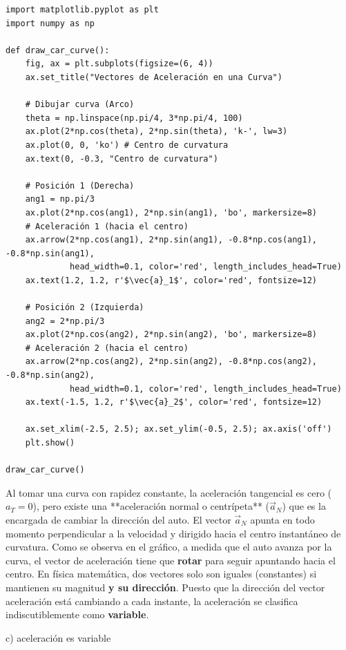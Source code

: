 \documentclass[12pt, a4paper]{article}
\begin{document}
\begin{lstlisting}
import matplotlib.pyplot as plt
import numpy as np

def draw_car_curve():
    fig, ax = plt.subplots(figsize=(6, 4))
    ax.set_title("Vectores de Aceleración en una Curva")
    
    # Dibujar curva (Arco)
    theta = np.linspace(np.pi/4, 3*np.pi/4, 100)
    ax.plot(2*np.cos(theta), 2*np.sin(theta), 'k-', lw=3)
    ax.plot(0, 0, 'ko') # Centro de curvatura
    ax.text(0, -0.3, "Centro de curvatura")

    # Posición 1 (Derecha)
    ang1 = np.pi/3
    ax.plot(2*np.cos(ang1), 2*np.sin(ang1), 'bo', markersize=8)
    # Aceleración 1 (hacia el centro)
    ax.arrow(2*np.cos(ang1), 2*np.sin(ang1), -0.8*np.cos(ang1), -0.8*np.sin(ang1), 
             head_width=0.1, color='red', length_includes_head=True)
    ax.text(1.2, 1.2, r'$\vec{a}_1$', color='red', fontsize=12)

    # Posición 2 (Izquierda)
    ang2 = 2*np.pi/3
    ax.plot(2*np.cos(ang2), 2*np.sin(ang2), 'bo', markersize=8)
    # Aceleración 2 (hacia el centro)
    ax.arrow(2*np.cos(ang2), 2*np.sin(ang2), -0.8*np.cos(ang2), -0.8*np.sin(ang2), 
             head_width=0.1, color='red', length_includes_head=True)
    ax.text(-1.5, 1.2, r'$\vec{a}_2$', color='red', fontsize=12)

    ax.set_xlim(-2.5, 2.5); ax.set_ylim(-0.5, 2.5); ax.axis('off')
    plt.show()

draw_car_curve()
\end{lstlisting}

Al tomar una curva con rapidez constante, la aceleración tangencial es cero ($a_T = 0$), pero existe una **aceleración normal o centrípeta** ($\vec{a}_N$) que es la encargada de cambiar la dirección del auto. 
El vector $\vec{a}_N$ apunta en todo momento perpendicular a la velocidad y dirigido hacia el centro instantáneo de curvatura. 
Como se observa en el gráfico, a medida que el auto avanza por la curva, el vector de aceleración tiene que \textbf{rotar} para seguir apuntando hacia el centro. 
En física matemática, dos vectores solo son iguales (constantes) si mantienen su magnitud \textbf{y su dirección}. Puesto que la dirección del vector aceleración está cambiando a cada instante, la aceleración se clasifica indiscutiblemente como \textbf{variable}.

\begin{tcolorbox}[colback=green!5!white, colframe=green!50!black, title=Respuesta Final]
\centering \Large c) aceleración es variable
\end{tcolorbox}
\end{document}
